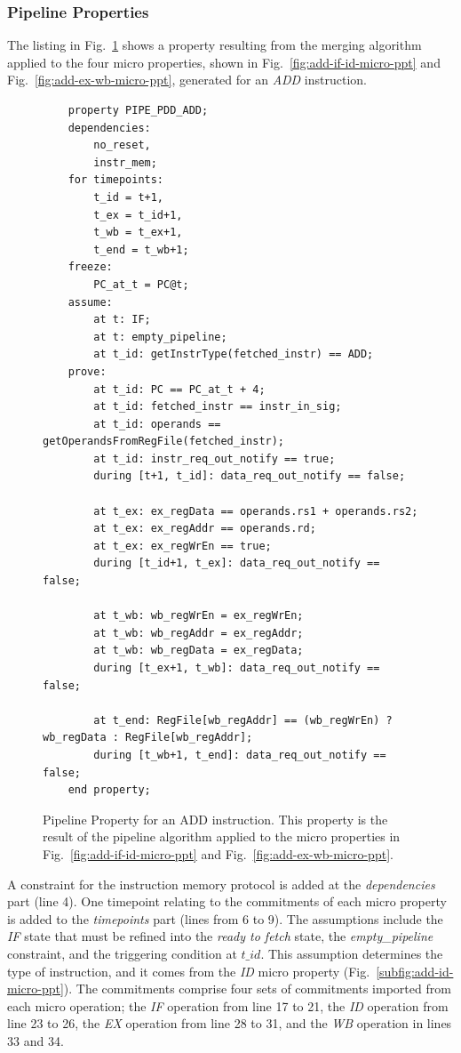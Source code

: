 \subsubsection*{Pipeline Properties}

The listing in Fig.~\ref{fig:add-ptt-merg-algorithm} shows a property resulting from the merging algorithm applied to the four micro properties, shown in Fig.~\ref{fig:add-if-id-micro-ppt} and Fig.~\ref{fig:add-ex-wb-micro-ppt}, generated for an \textit{ADD} instruction.

\begin{figure}[htb!]
    \begin{lstlisting}
    property PIPE_PDD_ADD;
    dependencies: 
        no_reset,
        instr_mem;
    for timepoints:
        t_id = t+1,
        t_ex = t_id+1,
        t_wb = t_ex+1,
        t_end = t_wb+1;
    freeze:
        PC_at_t = PC@t;
    assume:
        at t: IF;
        at t: empty_pipeline;
        at t_id: getInstrType(fetched_instr) == ADD;
    prove:
        at t_id: PC == PC_at_t + 4;
        at t_id: fetched_instr == instr_in_sig;
        at t_id: operands == getOperandsFromRegFile(fetched_instr);
        at t_id: instr_req_out_notify == true;
        during [t+1, t_id]: data_req_out_notify == false;
    
        at t_ex: ex_regData == operands.rs1 + operands.rs2;
        at t_ex: ex_regAddr == operands.rd;
        at t_ex: ex_regWrEn == true;
        during [t_id+1, t_ex]: data_req_out_notify == false;
    
        at t_wb: wb_regWrEn = ex_regWrEn;
        at t_wb: wb_regAddr = ex_regAddr;
        at t_wb: wb_regData = ex_regData;
        during [t_ex+1, t_wb]: data_req_out_notify == false;
    
        at t_end: RegFile[wb_regAddr] == (wb_regWrEn) ? wb_regData : RegFile[wb_regAddr];
        during [t_wb+1, t_end]: data_req_out_notify == false;
    end property;\end{lstlisting}
    \caption{Pipeline Property for an ADD instruction. This property is the result of the pipeline algorithm applied to the micro properties in Fig.~\ref{fig:add-if-id-micro-ppt} and Fig.~\ref{fig:add-ex-wb-micro-ppt}.}
    \label{fig:add-ptt-merg-algorithm}
\end{figure}

A constraint for the instruction memory protocol is added at the \textit{dependencies} part (line 4). One timepoint relating to the commitments of each micro property is added to the \textit{timepoints} part (lines from 6 to 9). The assumptions include the \textit{IF} state that must be refined into the \textit{ready to fetch} state, the \textit{empty\_pipeline} constraint, and the triggering condition at $t\_id$. This assumption determines the type of instruction, and it comes from the \textit{ID} micro property (Fig.~\ref{subfig:add-id-micro-ppt}). The commitments comprise four sets of commitments imported from each micro operation; the \textit{IF} operation from line 17 to 21, the \textit{ID} operation from line 23 to 26, the \textit{EX} operation from line 28 to 31, and the \textit{WB} operation in lines 33 and 34.

